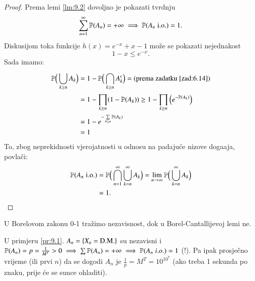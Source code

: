 \begin{proof}
    Prema lemi \ref{lm:9.2} dovoljno je pokazati tvrdnju
    \begin{equation*}
        \sum\limits_{n = 1}^{\infty} \mathbb{P}({A_n}) = + \infty \implies \mathbb{P}({A_n \; \mathrm{i.o.}}) = 1.
    \end{equation*}
    Diskusijom toka funkcije $h(x) = e^{-x} + x - 1$ mo\v ze se pokazati nejednakost
    \begin{equation*}
        1 - x \leq e^{-x}.
    \end{equation*}
    Sada imamo:
    \begin{equation*}
        \begin{aligned}
            \mathbb{P} \Big(\bigcup\limits_{k \geq n}^{} A_k \Big) &= 1 - \mathbb{P} \Big( \bigcap\limits_{k \geq n}^{} A_k^c \Big) = (\textnormal{prema zadatku \ref{zad:6.14}})\\
            &= 1 - \prod\limits_{k \geq n}^{} (1 - \mathbb{P}({A_k})) \geq 1 - \prod\limits_{k \geq n}^{} \Big( e^{- \mathbb{P} (A_k)} \Big)\\
            &= 1 - e^{- \sum\limits_{k \geq n}^{} \mathbb{P}({A_k})}\\
            &= 1
        \end{aligned}
    \end{equation*}
    To, zbog neprekidnosti vjerojatnosti u odnosu na padaju\' ce nizove doga\dj aja, povla\v ci:
    \begin{equation*}
        \begin{aligned}
            \mathbb{P} ( A_n \; \mathrm{i.o.} ) &= \mathbb{P} \Big( \bigcap\limits_{n = 1}^{\infty} \bigcup\limits_{k = n}^{\infty} A_k \Big) = \lim\limits_{n \to \infty} \mathbb{P} \Big( \bigcup\limits_{k = n}^{\infty} A_k \Big)\\
            &= 1.
        \end{aligned}
    \end{equation*}
\end{proof}

\begin{nap} \label{nap:9.3-1}
    U Borelovom zakonu 0-1 tra\v zimo nezavisnost, dok u Borel-Cantallijevoj lemi ne.
\end{nap}

\begin{nap} \label{nap:9.4}
    U primjeru \ref{pr:9.1}. $A_n = \{ X_n = \textnormal{D.M.} \}$ su nezavisni i $\mathbb{P}({A_n}) = p = \frac{1}{M^T} > 0 \implies \sum \mathbb{P}({A_n}) = +\infty \implies \mathbb{P}({A_n \; i.o.}) = 1$ (!).
    Pa ipak prosje\v cno vrijeme (ili prvi $n$) da se dogodi $A_n$ je $\frac{1}{p} = M^T = 10^{10^7}$ (ako treba 1 sekunda po znaku, prije \' ce se sunce ohladiti).
\end{nap}


